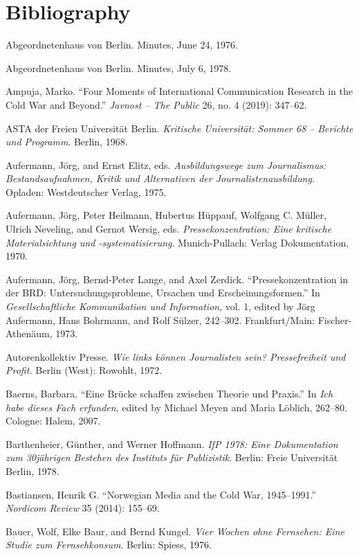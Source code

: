 \documentclass{tufte-handout}
\begin{document}
\section{Bibliography}\label{bibliography}

\begin{hangparas}{.25in}{1} 



Abgeordnetenhaus von Berlin. Minutes, June 24, 1976.

Abgeordnetenhaus von Berlin. Minutes, July 6, 1978.

Ampuja, Marko. ``Four Moments of International Communication Research in
the Cold War and Beyond.'' \emph{Javnost -- The Public} 26, no. 4
(2019): 347--62.

ASTA der Freien Universität Berlin. \emph{Kritische Universität: Sommer
68 -- Berichte und Programm}. Berlin, 1968.

Aufermann, Jörg, and Ernst Elitz, eds. \emph{Ausbildungswege zum
Journalismus: Bestandsaufnahmen, Kritik und Alternativen der
Journalistenausbildung}. Opladen: Westdeutscher Verlag, 1975.

Aufermann, Jörg, Peter Heilmann, Hubertus Hüppauf, Wolfgang C. Müller,
Ulrich Neveling, and Gernot Wersig, eds. \emph{Pressekonzentration: Eine
kritische Materialsichtung und -systematisierung}. Munich-Pullach:
Verlag Dokumentation, 1970.

Aufermann, Jörg, Bernd-Peter Lange, and Axel Zerdick.
``Pressekonzentration in der BRD: Untersuchungsprobleme, Ursachen und
Erscheinungsformen.'' In \emph{Gesellschaftliche Kommunikation und
Information}, vol. 1, edited by Jörg Aufermann, Hans Bohrmann, and Rolf
Sülzer, 242--302. Frankfurt/Main: Fischer-Athenäum, 1973.

Autorenkollektiv Presse. \emph{Wie links können Journalisten sein?
Pressefreiheit und Profit.} Berlin (West): Rowohlt, 1972.

Baerns, Barbara. ``Eine Brücke schaffen zwischen Theorie und Praxis.''
In \emph{Ich habe dieses Fach erfunden}, edited by Michael Meyen and
Maria Löblich, 262--80. Cologne: Halem, 2007.

Barthenheier, Günther, and Werner Hoffmann. \emph{IfP 1978: Eine
Dokumentation zum 30jährigen Bestehen des Instituts für Publizistik}.
Berlin: Freie Universität Berlin, 1978.

Bastiansen, Henrik G. ``Norwegian Media and the Cold War, 1945--1991.''
\emph{Nordicom Review} 35 (2014): 155--69.

Bauer, Wolf, Elke Baur, and Bernd Kungel. \emph{Vier Wochen ohne
Fernsehen: Eine Studie zum Fernsehkonsum}. Berlin: Spiess, 1976.


\end{hangparas}
\end{document}
